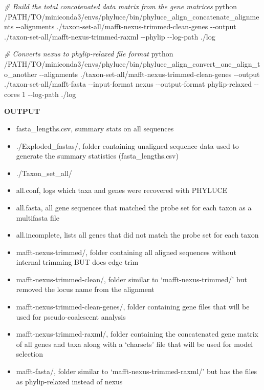 \documentclass[
  12pt,
]{article}
\newenvironment{Shaded}{\begin{snugshade}}{\end{snugshade}}
\newcommand{\AttributeTok}[1]{\textcolor[rgb]{0.13,0.29,0.53}{#1}}
\newcommand{\CommentTok}[1]{\textcolor[rgb]{0.56,0.35,0.01}{\textit{#1}}}
\newcommand{\ExtensionTok}[1]{#1}
\newcommand{\NormalTok}[1]{#1}
\providecommand{\tightlist}{%
  \setlength{\itemsep}{0pt}\setlength{\parskip}{0pt}}
\begin{document}
\begin{Shaded}
\begin{Highlighting}[]
\CommentTok{\# Build the total concatenated data matrix from the gene matrices}
\ExtensionTok{python}\NormalTok{ /PATH/TO/miniconda3/envs/phyluce/bin/phyluce\_align\_concatenate\_alignments }\AttributeTok{{-}{-}alignments}\NormalTok{ ./taxon{-}set{-}all/mafft{-}nexus{-}trimmed{-}clean{-}genes }\AttributeTok{{-}{-}output}\NormalTok{ ./taxon{-}set{-}all/mafft{-}nexus{-}trimmed{-}raxml }\AttributeTok{{-}{-}phylip} \AttributeTok{{-}{-}log{-}path}\NormalTok{ ./log}

\CommentTok{\# Converts nexus to phylip{-}relaxed file format}
\ExtensionTok{python}\NormalTok{ /PATH/TO/miniconda3/envs/phyluce/bin/phyluce\_align\_convert\_one\_align\_to\_another }\AttributeTok{{-}{-}alignments}\NormalTok{ ./taxon{-}set{-}all/mafft{-}nexus{-}trimmed{-}clean{-}genes }\AttributeTok{{-}{-}output}\NormalTok{ ./taxon{-}set{-}all/mafft{-}fasta }\AttributeTok{{-}{-}input{-}format}\NormalTok{ nexus }\AttributeTok{{-}{-}output{-}format}\NormalTok{ phylip{-}relaxed }\AttributeTok{{-}{-}cores}\NormalTok{ 1 }\AttributeTok{{-}{-}log{-}path}\NormalTok{ ./log}
\end{Highlighting}
\end{Shaded}

\textbf{OUTPUT}

\begin{itemize}
\tightlist
\item
  fasta\_lengths.csv, summary stats on all sequences
\item
  ./Exploded\_fastas/, folder containing unaligned sequence data used to generate the summary statistics (fasta\_lengths.csv)
\item
  ./Taxon\_set\_all/
\item
  all.conf, logs which taxa and genes were recovered with PHYLUCE
\item
  all.fasta, all gene sequences that matched the probe set for each taxon as a multifasta file
\item
  all.incomplete, lists all genes that did not match the probe set for each taxon
\item
  mafft-nexus-trimmed/, folder containing all aligned sequences without internal trimming BUT does edge trim
\item
  mafft-nexus-trimmed-clean/, folder similar to `mafft-nexus-trimmed/' but removed the locus name from the alignment
\item
  mafft-nexus-trimmed-clean-genes/, folder containing gene files that will be used for pseudo-coalescent analysis
\item
  mafft-nexus-trimmed-raxml/, folder containing the concatenated gene matrix of all genes and taxa along with a `charsets' file that will be used for model selection
\item
  mafft-fasta/, folder similar to `mafft-nexus-trimmed-raxml/' but has the files as phylip-relaxed instead of nexus
\end{itemize}
\end{document}

